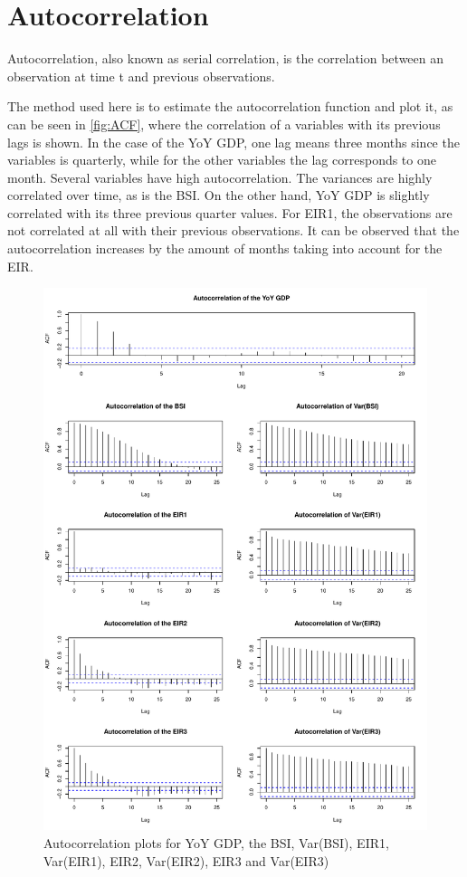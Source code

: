 \documentclass[12pt,a4paper,oneside]{book}
\begin{document}
\section{Autocorrelation}

Autocorrelation, also known as serial correlation, is the correlation between an observation at time t and previous observations.

The method used here is to estimate the autocorrelation function and plot it, as can be seen in \autoref{fig:ACF}, where the correlation of a variables with its previous lags is shown. In the case of the YoY GDP, one lag means three months since the variables is quarterly, while for the other variables the lag corresponds to one month.
Several variables have high autocorrelation. The variances are highly correlated over time, as is the BSI. 
On the other hand, YoY GDP is slightly correlated with its three previous quarter values. 
For EIR1, the observations are not correlated at all with their previous observations. It can be observed that the autocorrelation increases by the amount of months taking into account for the EIR.


\begin{figure}[!htbp]
    \centering
    \captionsetup{justification=centering}
    \includegraphics[scale=0.75]{Graphs/ACF.pdf}
    \caption{Autocorrelation plots for YoY GDP, the BSI, Var(BSI), EIR1, Var(EIR1), EIR2, Var(EIR2), EIR3 and Var(EIR3)}
    \label{fig:ACF}
\end{figure}
\end{document}

